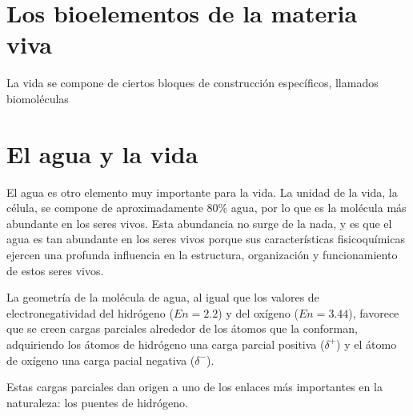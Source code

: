 \section{Los bioelementos de la materia viva}

La vida se compone de ciertos bloques de construcción específicos, llamados biomoléculas

\section{El agua y la vida}

El agua es otro elemento muy importante para la vida. La unidad de la vida, la célula, se compone de aproximadamente 80\% agua, por lo que es la molécula más abundante en los seres vivos. Esta abundancia no surge de la nada, y es que el agua es tan abundante en los seres vivos porque sus características fisicoquímicas ejercen una profunda influencia en la estructura, organización y funcionamiento de estos seres vivos.   



La geometría de la molécula de agua, al igual que los valores de electronegatividad del hidrógeno ($En = 2.2$) y del oxígeno ($En = 3.44$), favorece que se creen cargas parciales alrededor de los átomos que la conforman, adquiriendo los átomos de hidrógeno una carga parcial positiva ($\delta^{+}$) y el átomo de oxígeno una carga pacial negativa ($\delta^{-}$).

Estas cargas parciales dan origen a uno de los enlaces más importantes en la naturaleza: los puentes de hidrógeno.

